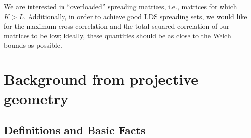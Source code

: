 \documentclass[journal,comsoc]{IEEEtran}
\begin{document}
We are interested in ``overloaded'' spreading matrices, i.e., matrices for which $K > L$. Additionally, in order to achieve good LDS spreading sets, we would like for the maximum cross-correlation and the total squared correlation of our matrices to be low; ideally, these quantities should be as close to the Welch bounds as possible.
\iffalse 
We require the sequence vectors in our matrices to be sparse. \iffalse (in the sense specified at the beginning of Section \ref{sec:transmission})\fi It is desirable \iffalse (and it would facilitate the implementation of our scheme in practice) \fi to have nonzero entries that come from a small alphabet in our sequence vectors (e.g., $\lbrace \text{exp}(j\frac{2\pi}{T}t)\rbrace$, $t =0,1,\dots, T-1$, etc.). Although, it is important to note that when one does restrict one's attention to vectors with entries from a restricted alphabet, it is not always possible to attain the Welch bounds. \fi
\iffalse
Finally, for many applications, we want to maximize the minimum Euclidean distance between the sequence vectors in our spreading matrices.\fi
\vspace{-0.0cm}
\section{Background from projective geometry}
\label{lines and quadrics}
\subsection{Definitions and Basic Facts}
\iffalse
For proofs of the results stated in this subsection, see any introductory projective geometry textbook (for example, \cite{Beutelspacher1998}).

A \emph{projective plane} $\mathcal{P}$ is a geometry that satisfies the following axioms.\\
(i) Any two points are incident with exactly one line.\\
(ii) Any two lines intersect one another in a unique point.\\
(iii) There exist four points, no three of which are collinear.

A projective plane with a finite point set is a \emph{finite projective plane}. It can be shown that for any finite projective plane $\mathcal{P}$, there exists a number $k$ such that each line in the plane is incident with exactly $k+1$ points, each point in the plane is incident with exactly $k+1$ lines, and also such that $\mathcal{P}$ contains exactly $k^2+k+1$ points and $k^2+k+1$ lines. The number $k$ is called the \emph{order} of $\mathcal{P}$. \fi
\end{document}
